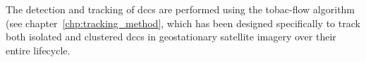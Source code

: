 The detection and tracking of \acrshort{dcc}s are performed using the tobac-flow algorithm (see chapter~\ref{chp:tracking_method}, which has been designed specifically to track both isolated and clustered \acrshort{dcc}s in geostationary satellite imagery over their entire lifecycle. 



